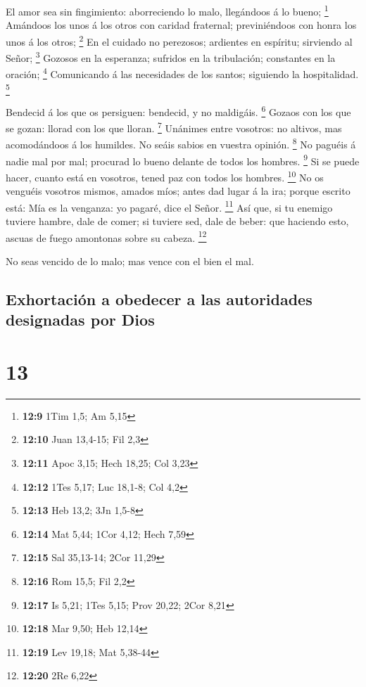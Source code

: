  El amor sea sin fingimiento: aborreciendo lo malo,
llegándoos á lo bueno; \footnote{\textbf{12:9} 1Tim 1,5; Am 5,15}
 Amándoos los unos á los otros con caridad fraternal;
previniéndoos con honra los unos á los otros; \footnote{\textbf{12:10}
  Juan 13,4-15; Fil 2,3}  En el cuidado no perezosos;
ardientes en espíritu; sirviendo al Señor; \footnote{\textbf{12:11} Apoc
  3,15; Hech 18,25; Col 3,23}  Gozosos en la esperanza;
sufridos en la tribulación; constantes en la oración; \footnote{\textbf{12:12}
  1Tes 5,17; Luc 18,1-8; Col 4,2}  Comunicando á las
necesidades de los santos; siguiendo la hospitalidad. \footnote{\textbf{12:13}
  Heb 13,2; 3Jn 1,5-8}

 Bendecid á los que os persiguen: bendecid, y no
maldigáis. \footnote{\textbf{12:14} Mat 5,44; 1Cor 4,12; Hech 7,59}
 Gozaos con los que se gozan: llorad con los que lloran.
\footnote{\textbf{12:15} Sal 35,13-14; 2Cor 11,29} 
Unánimes entre vosotros: no altivos, mas acomodándoos á los humildes. No
seáis sabios en vuestra opinión. \footnote{\textbf{12:16} Rom 15,5; Fil
  2,2}  No paguéis á nadie mal por mal; procurad lo bueno
delante de todos los hombres. \footnote{\textbf{12:17} Is 5,21; 1Tes
  5,15; Prov 20,22; 2Cor 8,21}  Si se puede hacer, cuanto
está en vosotros, tened paz con todos los hombres. \footnote{\textbf{12:18}
  Mar 9,50; Heb 12,14}  No os venguéis vosotros mismos,
amados míos; antes dad lugar á la ira; porque escrito está: Mía es la
venganza: yo pagaré, dice el Señor. \footnote{\textbf{12:19} Lev 19,18;
  Mat 5,38-44}  Así que, si tu enemigo tuviere hambre,
dale de comer; si tuviere sed, dale de beber: que haciendo esto, ascuas
de fuego amontonas sobre su cabeza. \footnote{\textbf{12:20} 2Re 6,22}

 No seas vencido de lo malo; mas vence con el bien el
mal.

\hypertarget{exhortaciuxf3n-a-obedecer-a-las-autoridades-designadas-por-dios}{%
\subsection{Exhortación a obedecer a las autoridades designadas por
Dios}\label{exhortaciuxf3n-a-obedecer-a-las-autoridades-designadas-por-dios}}

\hypertarget{section-12}{%
\section{13}\label{section-12}}

